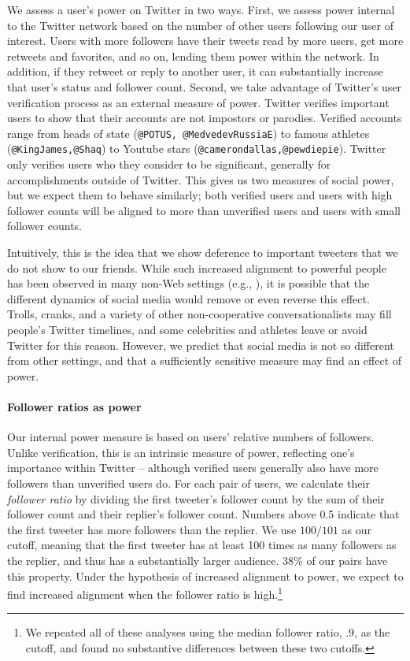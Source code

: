 \documentclass{acm_proc_article-sp}
\begin{document}
We assess a user's power on Twitter in two ways. First, we assess power internal to the Twitter network based on the number of other users following our user of interest.  Users with more followers have their tweets read by more users, get more retweets and favorites, and so on, lending them power within the network.  In addition, if they retweet or reply to another user, it can substantially increase that user's status and follower count.  Second, we take advantage of Twitter's user verification process as an external measure of power.  Twitter verifies important users to show that their accounts are not impostors or parodies.  Verified accounts range from heads of state (\texttt{@POTUS, @MedvedevRussiaE}) to famous athletes (\texttt{@KingJames,@Shaq}) to Youtube stars (\texttt{@camerondallas,@pewdiepie}). Twitter only verifies users who they consider to be significant, generally for accomplishments outside of Twitter.  This gives us two measures of social power, but we expect them to behave similarly; both verified users and users with high follower counts will be aligned to more than unverified users and users with small follower counts.

Intuitively, this is the idea that we show deference to important tweeters that we do not show to our friends. While such increased alignment to powerful people has been observed in many non-Web settings (e.g., \cite{guo2015}), it is possible that the different dynamics of social media would remove or even reverse this effect.  Trolls, cranks, and a variety of other non-cooperative conversationalists may fill people's Twitter timelines, and some celebrities and athletes leave or avoid Twitter for this reason.  However, we predict that social media is not so different from other settings, and that a sufficiently sensitive measure may find an effect of power.

\paragraph{Follower ratios as power} Our internal power measure is based on users' relative numbers of followers.  Unlike verification, this is an intrinsic measure of power, reflecting one's importance within Twitter -- although verified users generally also have more followers than unverified users do. For each pair of users, we calculate their \textit{follower ratio} by dividing the first tweeter's follower count by the sum of their follower count and their replier's follower count.  Numbers above 0.5 indicate that the first tweeter has more followers than the replier.  We use $100/101$ as our cutoff, meaning that the first tweeter has at least 100 times as many followers as the replier, and thus has a substantially larger audience. 38\% of our pairs have this property.  Under the hypothesis of increased alignment to power, we expect to find increased alignment when the follower ratio is high.\footnote{We repeated all of these analyses using the median follower ratio, $.9$, as the cutoff, and found no substantive differences between these two cutoffs.}
\end{document}
